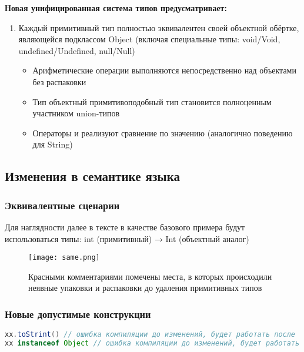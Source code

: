 \textbf{Новая унифицированная система типов предусматривает:}
\begin{enumerate}[leftmargin=*]
    \item Каждый примитивный тип полностью эквивалентен своей объектной обёртке, являющейся подклассом Object
    (включая специальные типы: void/Void, undefined/Undefined, null/Null)
    \begin{itemize}[label={--}]
        \item Арифметические операции выполняются непосредственно над объектами без распаковки
        \item Тип объектный примитивоподобный тип становится полноценным участником union-типов
        \item Операторы \code{==} и \code{===} реализуют сравнение по значению (аналогично поведению для String)
    \end{itemize}

\end{enumerate}

\subsection{Изменения в семантике языка}
\subsubsection{Эквивалентные сценарии}
Для наглядности далее в тексте в качестве базового примера будут использоваться типы:
int (примитивный) → Int (объектный аналог)
\begin{figure}[H]
    \centering
    \texttt{[image: same.png]}
    \caption{Красными комментариями помечены места, в которых происходили неявные упаковки и распаковки до удаления примитивных типов}
    \label{fig:example}
\end{figure}

\subsubsection{Новые допустимые конструкции}

\begin{lstlisting}[language=java,title=Пример в Java]
xx.toStrint() // ошибка компиляции до изменений, будет работать после
xx instanceof Object // ошибка компиляции до изменений, будет работать после
\end{lstlisting}


